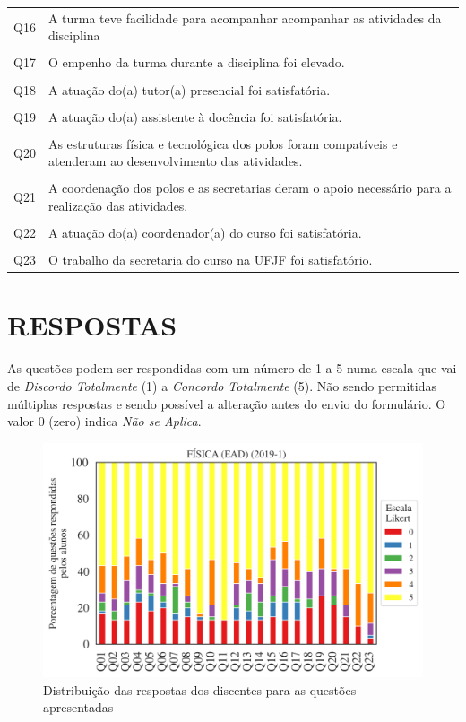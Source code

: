 \documentclass[a4paper,10pt]{article}
\begin{document}
{\begin{center}
\begin{tabularx}{\linewidth}{c|X}
Q16&A turma teve facilidade para acompanhar acompanhar as atividades da disciplina\\\\
Q17&O empenho da turma durante a disciplina foi elevado.\\\\
Q18&A atuação do(a) tutor(a) presencial foi satisfatória.\\\\
Q19&A atuação do(a) assistente à docência foi satisfatória.\\\\
Q20&As estruturas física e tecnológica dos polos foram compatíveis e atenderam ao desenvolvimento das atividades.\\\\
Q21&A coordenação dos polos e as secretarias deram o apoio necessário para a realização das atividades.\\\\
Q22&A atuação do(a) coordenador(a) do curso foi satisfatória.\\\\
Q23&O trabalho da secretaria do curso na UFJF foi satisfatório.
\end{tabularx}
\end{center}
}
\section{RESPOSTAS}
As questões podem ser respondidas com um número de 1 a 5 numa escala que vai de {\it Discordo Totalmente} (1) a {\it Concordo Totalmente} (5). Não sendo permitidas múltiplas respostas e sendo possível a alteração antes do envio do formulário. O valor 0 (zero) indica {\it Não se Aplica}.


\begin{figure}[h]
\centering
\includegraphics[width=0.999\linewidth]{resposta_questoes_curso_113527.png}
\caption{\label{fig:resposta_questoes_curso}Distribuição das respostas dos discentes para as questões apresentadas}
\end{figure}
\end{document}

